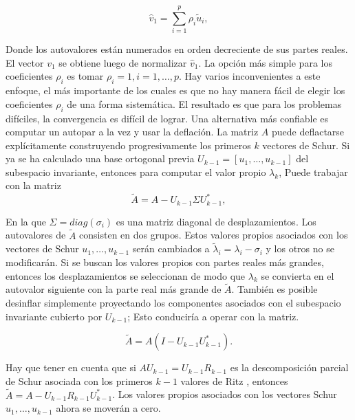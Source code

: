 \documentclass[a4paper,openright,12pt, oneside]{book}
\begin{document}
\begin{displaymath}\hat v_1 = \sum_{i=1}^p \rho_i \tilde u_i, \end{displaymath}

Donde los autovalores est\'an numerados en orden decreciente de sus partes reales. El vector $ v_1 $ se obtiene luego de normalizar $ \hat v_1 $. La opci\'on m\'as simple para los coeficientes $ \rho_i $ es tomar $ \rho_i = 1, i = 1, \ldots, p $. Hay varios inconvenientes a este enfoque, el m\'as importante de los cuales es que no hay manera f\'acil de elegir los coeficientes $ \rho_i $ de una forma sistem\'atica. El resultado es que para los problemas dif\'iciles, la convergencia es dif\'icil de lograr.
Una alternativa m\'as confiable es computar un autopar a la vez y usar la deflaci\'on. La matriz $ A $ puede deflactarse expl\'icitamente construyendo progresivamente los primeros $ k $ vectores de Schur. Si ya se ha calculado una base ortogonal previa $ U_ {k-1} = [u_1, \ldots, u_ {k-1}] $ del subespacio invariante, entonces para computar el valor propio $ \lambda_{k} $, Puede trabajar con la matriz
\begin{displaymath}
\tilde A = A - U_{k-1} \Sigma U_{k-1}^{\ast}, 
\end{displaymath}


En la que $\Sigma = diag(\sigma_i)$ es una matriz diagonal de desplazamientos. Los autovalores de $ \tilde A $ consisten en dos grupos. Estos valores propios asociados con los vectores de Schur $ u_1, 
\ldots, u_{k-1} $ ser\'an cambiados a $ \tilde \lambda_i = \lambda_i - \sigma_i $ y los otros no se modificar\'an. Si se buscan los valores propios con partes reales m\'as grandes, entonces los desplazamientos se seleccionan de modo que $ \lambda_k $ se convierta en el autovalor siguiente con la parte real m\'as grande de $ \tilde A $. Tambi\'en es posible desinflar simplemente proyectando los componentes asociados con el subespacio invariante cubierto por $ U_ {k-1} $; Esto conducir\'ia a operar con la matriz.

\begin{displaymath}
\tilde A = A (I - U_{k-1} U_{k-1}^{\ast}).
\end{displaymath}

Hay que tener en cuenta que si $ A U_{k-1} = U_ {k-1} R_ {k-1} $ es la descomposici\'on parcial de Schur asociada con los primeros $ k-1 $ valores de Ritz , entonces $ \tilde A = A - U_ {k-1} R_ {k-1} U_ {k-1} ^ {\ast} $. Los valores propios asociados con los vectores Schur $ u_1, \ldots, u_ {k-1} $ ahora se mover\'an a cero.
\end{document}
